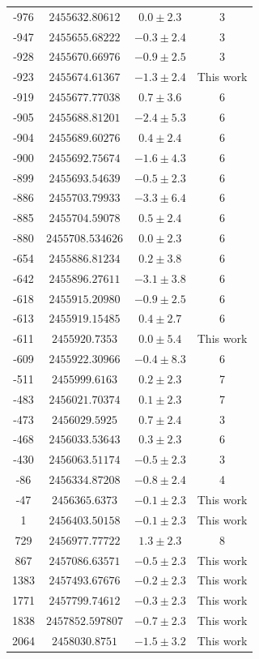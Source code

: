 \begin{longtable}{cccc}
-976 & $2455632.80612$ & $0.0\pm2.3$ & 3 \\
-947 & $2455655.68222$ & $-0.3\pm2.4$ & 3 \\
-928 & $2455670.66976$ & $-0.9\pm2.5$ & 3 \\
-923 & $2455674.61367$ & $-1.3\pm2.4$ & This work \\
-919 & $2455677.77038$ & $0.7\pm3.6$ & 6  \\
-905 & $2455688.81201$ & $-2.4\pm5.3$ & 6 \\
-904 & $2455689.60276$ & $0.4\pm2.4$ & 6 \\
-900 & $2455692.75674$ & $-1.6\pm4.3$ & 6 \\
-899 & $2455693.54639$ & $-0.5\pm2.3$ & 6  \\
-886 & $2455703.79933$ & $-3.3\pm6.4$ & 6 \\
-885 & $2455704.59078$ & $0.5\pm2.4$ & 6 \\
-880 & $2455708.534626$ & $0.0\pm 2.3$ & 6  \\
-654 & $2455886.81234$ &  $0.2\pm3.8$ & 6 \\
-642 & $2455896.27611$ & $-3.1\pm3.8$ & 6 \\
-618 & $2455915.20980$ & $-0.9\pm2.5$ & 6  \\
-613 & $2455919.15485$ & $0.4\pm 2.7$ & 6\\
-611 & $2455920.7353$ & $0.0\pm5.4$ & This work \\
-609 & $2455922.30966$ & $-0.4\pm8.3$ & 6 \\
-511 & $2455999.6163$ & $0.2\pm2.3$ & 7 \\
-483 & $2456021.70374$ & $0.1\pm2.3$ & 7 \\
-473 & $2456029.5925$ & $0.7\pm 2.4$ &3 \\
-468 & $2456033.53643$ &  $0.3\pm 2.3$ & 6  \\
-430 & $2456063.51174$ & $-0.5\pm 2.3$ & 3 \\
-86 & $2456334.87208$ & $-0.8\pm2.4$ & 4 \\
-47 & $2456365.6373$  & $-0.1\pm2.3$& This work \\
1 & $2456403.50158$ &  $-0.1\pm2.3$ & This work \\
729 & $2456977.77722$  & $1.3\pm2.3$ & 8 \\
867 & $2457086.63571$ & $-0.5\pm2.3$& This work \\
1383 & $2457493.67676$   & $-0.2\pm2.3$& This work  \\
1771 & $2457799.74612$ &  $-0.3\pm2.3$ & This work \\
1838 & $2457852.597807$ & $-0.7\pm2.3$ & This work\\ 
2064 & $2458030.8751$  & $-1.5\pm3.2$& This work \\
\hline
\end{longtable} 


